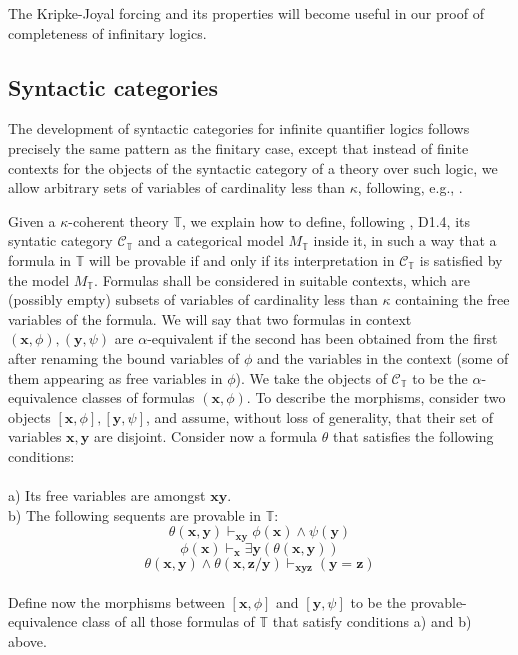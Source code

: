 \documentclass[a4paper,11pt]{article}
\theoremstyle{plain}
\theoremstyle{plain}
\theoremstyle{remark}
\newcommand{\theory}{\ensuremath{\mathbb{T}}}
\begin{document}
The Kripke-Joyal forcing and its properties will become useful in our proof of completeness of infinitary logics.


\subsection{Syntactic categories}

The development of syntactic categories for infinite quantifier logics follows precisely the same pattern as the finitary case, except that instead of finite contexts for the objects of the syntactic category of a theory over such logic, we allow arbitrary sets of variables of cardinality less than $\kappa$, following, e.g., \cite{makkai}. 

Given a $\kappa$-coherent theory $\theory$, we explain how to define, following \cite{johnstone}, D1.4, its syntatic category $\mathcal{C}_{\theory}$ and a categorical model $M_{\theory}$ inside it, in such a way that a formula in $\theory$ will be provable if and only if its interpretation in $\mathcal{C}_{\theory}$ is satisfied by the model $M_{\theory}$. Formulas shall be considered in suitable contexts, which are (possibly empty) subsets of variables of cardinality less than $\kappa$ containing the free variables of the formula. We will say that two formulas in context $(\mathbf{x}, \phi), (\mathbf{y}, \psi)$ are $\alpha$-equivalent if the second has been obtained from the first after renaming the bound variables of $\phi$ and the variables in the context (some of them appearing as free variables in $\phi$). We take the objects of $\mathcal{C}_{\theory}$ to be the $\alpha$-equivalence classes of formulas $(\mathbf{x}, \phi)$. To describe the morphisms, consider two objects $[\mathbf{x}, \phi], [\mathbf{y}, \psi]$, and assume, without loss of generality, that their set of variables $\mathbf{x}, \mathbf{y}$ are disjoint. Consider now a formula $\theta$ that satisfies the following conditions:\\
\\
a) Its free variables are amongst $\mathbf{x}\mathbf{y}$.\\
b) The following sequents are provable in $\theory$:\\

$$ \theta(\mathbf{x}, \mathbf{y}) \vdash_{\mathbf{x}\mathbf{y}} \phi(\mathbf{x}) \wedge \psi(\mathbf{y})$$
$$ \phi(\mathbf{x}) \vdash_{\mathbf{x}} \exists \mathbf{y} (\theta(\mathbf{x},\mathbf{y}))$$
$$ \theta(\mathbf{x}, \mathbf{y}) \wedge \theta(\mathbf{x}, \mathbf{z}/\mathbf{y}) \vdash_{\mathbf{x}\mathbf{y}\mathbf{z}} (\mathbf{y}=\mathbf{z})$$
\\
Define now the morphisms between $[\mathbf{x}, \phi]$ and $[\mathbf{y}, \psi]$ to be the provable-equivalence class of all those formulas of $\theory$ that satisfy conditions a) and b) above. 
\end{document}
